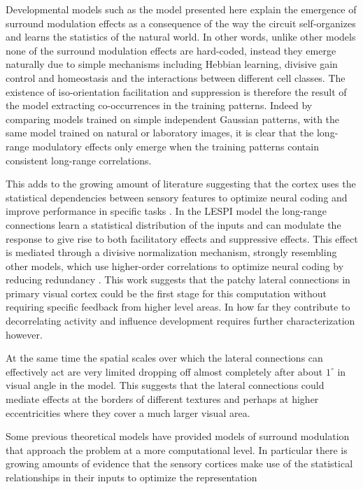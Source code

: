 Developmental models such as the model presented here explain the
emergence of surround modulation effects as a consequence of the way
the circuit self-organizes and learns the statistics of the natural
world. In other words, unlike other models none of the surround
modulation effects are hard-coded, instead they emerge naturally due
to simple mechanisms including Hebbian learning, divisive gain control
and homeostasis and the interactions between different cell
classes. The existence of iso-orientation facilitation and suppression
is therefore the result of the model extracting co-occurrences in the
training patterns. Indeed by comparing models trained on simple
independent Gaussian patterns, with the same model trained on natural
or laboratory images, it is clear that the long-range modulatory
effects only emerge when the training patterns contain consistent
long-range correlations.

This adds to the growing amount of literature suggesting that the
cortex uses the statistical dependencies between sensory features to
optimize neural coding \citep{Vinje2000, Simoncelli2001} and improve
performance in specific tasks \citep{Geisler2001}. In the LESPI model
the long-range connections learn a statistical distribution of the
inputs and can modulate the response to give rise to both facilitatory
effects and suppressive effects. This effect is mediated through a
divisive normalization mechanism, strongly resembling other models,
which use higher-order correlations to optimize neural coding by
reducing redundancy \citep{Spratling2011, Coen2015}. This work
suggests that the patchy lateral connections in primary visual cortex
could be the first stage for this computation without requiring
specific feedback from higher level areas. In how far they contribute
to decorrelating activity and influence development requires further
characterization however.

At the same time the spatial scales over which the lateral connections
can effectively act are very limited dropping off almost completely
after about $1^\circ$ in visual angle in the model. This suggests that
the lateral connections could mediate effects at the borders of
different textures and perhaps at higher eccentricities where they
cover a much larger visual area.

Some previous theoretical models have provided models of surround
modulation that approach the problem at a more computational level. In
particular there is growing amounts of evidence that the sensory
cortices make use of the statistical relationships in their inputs to
optimize the representation

